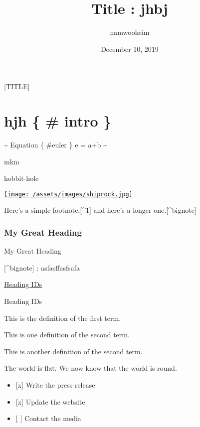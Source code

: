 \documentclass[]{article}
\title{Title : jhbj}
\author{namwookeim}
\date{December 10, 2019}
\providecommand{\tightlist}{%
  \setlength{\itemsep}{0pt}\setlength{\parskip}{0pt}}
\begin{document}
\maketitle

{[}TITLE{]}

\section{hjh \{ \# intro \}}\label{hjh-intro}

\textasciitilde{} Equation \{ \#euler \} e = a+b \textasciitilde{}

mkm

hobbit-hole

\href{https://www.flickr.com/photos/beaurogers/31833779864/in/photolist-Qv3rFw-34mt9F-a9Cmfy-5Ha3Zi-9msKdv-o3hgjr-hWpUte-4WMsJ1-KUQ8N-deshUb-vssBD-6CQci6-8AFCiD-zsJWT-nNfsgB-dPDwZJ-bn9JGn-5HtSXY-6CUhAL-a4UTXB-ugPum-KUPSo-fBLNm-6CUmpy-4WMsc9-8a7D3T-83KJev-6CQ2bK-nNusHJ-a78rQH-nw3NvT-7aq2qf-8wwBso-3nNceh-ugSKP-4mh4kh-bbeeqH-a7biME-q3PtTf-brFpgb-cg38zw-bXMZc-nJPELD-f58Lmo-bXMYG-bz8AAi-bxNtNT-bXMYi-bXMY6-bXMYv}{\texttt{[image: /assets/images/shiprock.jpg]}}

Here's a simple footnote,{[}\^{}1{]} and here's a longer
one.{[}\^{}bignote{]}

\subsubsection{My Great Heading}\label{custom-id}

My Great Heading

{[}\^{}bignote{]} : asfasffasfsafa

\protect\hyperlink{heading-ids}{Heading IDs}

Heading IDs

\begin{description}
\tightlist
\item[First Term]
This is the definition of the first term.
\item[Second Term]
This is one definition of the second term.

This is another definition of the second term.
\end{description}

\sout{The world is flat.} We now know that the world is round.

\begin{itemize}
\tightlist
\item
  {[}x{]} Write the press release
\item
  {[}x{]} Update the website
\item
  {[} {]} Contact the media
\end{itemize}
\end{document}

